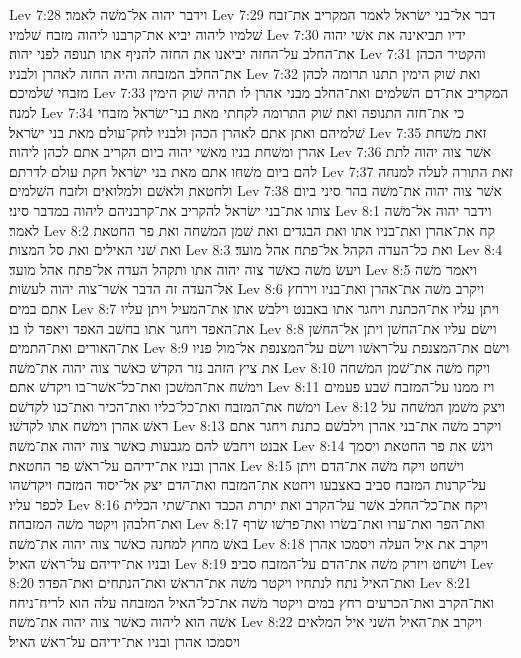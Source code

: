 Lev 7:28  וידבר יהוה אל־משׁה לאמר׃
Lev 7:29  דבר אל־בני ישׂראל לאמר המקריב את־זבח שׁלמיו ליהוה יביא את־קרבנו ליהוה מזבח שׁלמיו׃
Lev 7:30  ידיו תביאינה את אשׁי יהוה את־החלב על־החזה יביאנו את החזה להניף אתו תנופה לפני יהוה׃
Lev 7:31  והקטיר הכהן את־החלב המזבחה והיה החזה לאהרן ולבניו׃
Lev 7:32  ואת שׁוק הימין תתנו תרומה לכהן מזבחי שׁלמיכם׃
Lev 7:33  המקריב את־דם השׁלמים ואת־החלב מבני אהרן לו תהיה שׁוק הימין למנה׃
Lev 7:34  כי את־חזה התנופה ואת שׁוק התרומה לקחתי מאת בני־ישׂראל מזבחי שׁלמיהם ואתן אתם לאהרן הכהן ולבניו לחק־עולם מאת בני ישׂראל׃
Lev 7:35  זאת משׁחת אהרן ומשׁחת בניו מאשׁי יהוה ביום הקריב אתם לכהן ליהוה׃
Lev 7:36  אשׁר צוה יהוה לתת להם ביום משׁחו אתם מאת בני ישׂראל חקת עולם לדרתם׃
Lev 7:37  זאת התורה לעלה למנחה ולחטאת ולאשׁם ולמלואים ולזבח השׁלמים׃
Lev 7:38  אשׁר צוה יהוה את־משׁה בהר סיני ביום צותו את־בני ישׂראל להקריב את־קרבניהם ליהוה במדבר סיני׃
Lev 8:1  וידבר יהוה אל־משׁה לאמר׃
Lev 8:2  קח את־אהרן ואת־בניו אתו ואת הבגדים ואת שׁמן המשׁחה ואת פר החטאת ואת שׁני האילים ואת סל המצות׃
Lev 8:3  ואת כל־העדה הקהל אל־פתח אהל מועד׃
Lev 8:4  ויעשׂ משׁה כאשׁר צוה יהוה אתו ותקהל העדה אל־פתח אהל מועד׃
Lev 8:5  ויאמר משׁה אל־העדה זה הדבר אשׁר־צוה יהוה לעשׂות׃
Lev 8:6  ויקרב משׁה את־אהרן ואת־בניו וירחץ אתם במים׃
Lev 8:7  ויתן עליו את־הכתנת ויחגר אתו באבנט וילבשׁ אתו את־המעיל ויתן עליו את־האפד ויחגר אתו בחשׁב האפד ויאפד לו בו׃
Lev 8:8  וישׂם עליו את־החשׁן ויתן אל־החשׁן את־האורים ואת־התמים׃
Lev 8:9  וישׂם את־המצנפת על־ראשׁו וישׂם על־המצנפת אל־מול פניו את ציץ הזהב נזר הקדשׁ כאשׁר צוה יהוה את־משׁה׃
Lev 8:10  ויקח משׁה את־שׁמן המשׁחה וימשׁח את־המשׁכן ואת־כל־אשׁר־בו ויקדשׁ אתם׃
Lev 8:11  ויז ממנו על־המזבח שׁבע פעמים וימשׁח את־המזבח ואת־כל־כליו ואת־הכיר ואת־כנו לקדשׁם׃
Lev 8:12  ויצק משׁמן המשׁחה על ראשׁ אהרן וימשׁח אתו לקדשׁו׃
Lev 8:13  ויקרב משׁה את־בני אהרן וילבשׁם כתנת ויחגר אתם אבנט ויחבשׁ להם מגבעות כאשׁר צוה יהוה את־משׁה׃
Lev 8:14  ויגשׁ את פר החטאת ויסמך אהרן ובניו את־ידיהם על־ראשׁ פר החטאת׃
Lev 8:15  וישׁחט ויקח משׁה את־הדם ויתן על־קרנות המזבח סביב באצבעו ויחטא את־המזבח ואת־הדם יצק אל־יסוד המזבח ויקדשׁהו לכפר עליו׃
Lev 8:16  ויקח את־כל־החלב אשׁר על־הקרב ואת יתרת הכבד ואת־שׁתי הכלית ואת־חלבהן ויקטר משׁה המזבחה׃
Lev 8:17  ואת־הפר ואת־ערו ואת־בשׂרו ואת־פרשׁו שׂרף באשׁ מחוץ למחנה כאשׁר צוה יהוה את־משׁה׃
Lev 8:18  ויקרב את איל העלה ויסמכו אהרן ובניו את־ידיהם על־ראשׁ האיל׃
Lev 8:19  וישׁחט ויזרק משׁה את־הדם על־המזבח סביב׃
Lev 8:20  ואת־האיל נתח לנתחיו ויקטר משׁה את־הראשׁ ואת־הנתחים ואת־הפדר׃
Lev 8:21  ואת־הקרב ואת־הכרעים רחץ במים ויקטר משׁה את־כל־האיל המזבחה עלה הוא לריח־ניחח אשׁה הוא ליהוה כאשׁר צוה יהוה את־משׁה׃
Lev 8:22  ויקרב את־האיל השׁני איל המלאים ויסמכו אהרן ובניו את־ידיהם על־ראשׁ האיל׃
